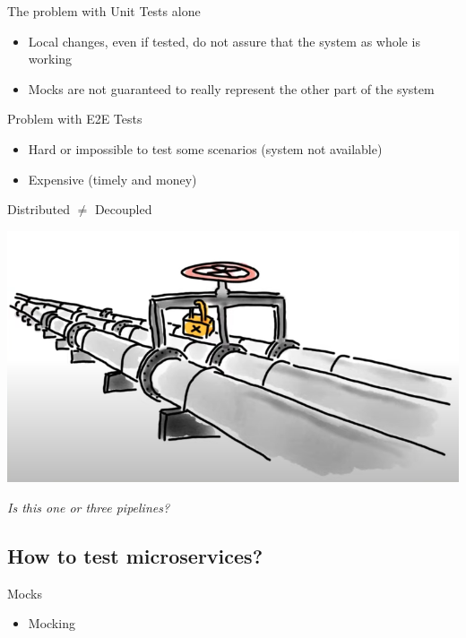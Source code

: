 \begin{frame}{The problem with Unit Tests alone}
  \begin{itemize}
    \item Local changes, even if tested, do not assure that the system as whole is working
    \item Mocks are not guaranteed to really represent the other part of the system
  \end{itemize}
\end{frame}

\begin{frame}{Problem with E2E Tests}
  \begin{itemize}
    \item Hard or impossible to test some scenarios (system not available)
    \item Expensive (timely and money)
  \end{itemize}
\end{frame}

\begin{frame}{Distributed $\ne$ Decoupled}
  \begin{center}
    \includegraphics[scale=.43]{./assets/coupling.png}

    \textit{Is this one or three pipelines?}
  \end{center}
\end{frame}







\subsection{How to test microservices?}
\begin{frame}{Mocks}
  \begin{itemize}
    \item Mocking
  \end{itemize}
\end{frame}


